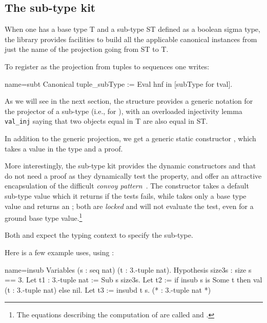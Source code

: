 \subsection{The sub-type kit}


When one has a base type T and a sub-type ST defined as a boolean
sigma type, the \mcbMC{} library provides facilities to
build all the applicable canonical instances from just
the name of the projection going from ST to T.

To register  as the projection from tuples to sequences one
writes:

\begin{coq}{name=subt}{}
Canonical tuple_subType := Eval hnf in [subType for tval].
\end{coq}

As we will see in the next section, the  structure provides
a generic notation  for the projector of a sub-type (i.e.,
 for ), with an overloaded injectivity lemma
\lstinline/val_inj/ saying that two objects equal in T are also equal
in ST.

In addition to the generic projection, we get a generic static
constructor , which takes a value in the type  and a proof.

More interestingly, the sub-type kit provides the dynamic constructors
 and  that do not need a proof as they dynamically
test the property, and offer
an attractive encapsulation of the difficult \emph{convoy
pattern}~\cite[section 8.4]{CPDT}.
The  constructor takes a default
sub-type value which it returns if the tests fails, while 
takes only a base type value and returns an ; both are
\emph{locked} and will not evaluate the test, even for a ground base
type value.\footnote{The equations describing the computation
of  are called  and .}

Both  and  expect the typing context to
specify the sub-type.

Here is a few example uses, using :

\begin{coq}{name=insub}{}
Variables (s : seq nat) (t : 3.-tuple nat).
Hypothesis size3s : size s == 3.
Let t1 : 3.-tuple nat := Sub s size3s.
Let t2 := if insub s is Some t then val (t : 3.-tuple nat) else nil.
Let t3 := insubd t s. (* : 3.-tuple nat *)
\end{coq}

